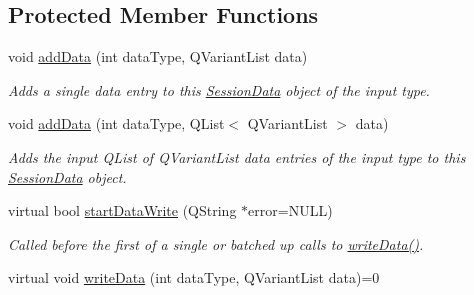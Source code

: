 \subsection*{Protected Member Functions}
\begin{DoxyCompactItemize}
\item 
void \hyperlink{class_session_data_a7cc8594766473824c591396b187354ad}{add\-Data} (int data\-Type, Q\-Variant\-List data)
\begin{DoxyCompactList}\small\item\em Adds a single data entry to this \hyperlink{class_session_data}{Session\-Data} object of the input type. \end{DoxyCompactList}\item 
void \hyperlink{class_session_data_a72da83d35fc78270dbfef9ba9a2b2b4c}{add\-Data} (int data\-Type, Q\-List$<$ Q\-Variant\-List $>$ data)
\begin{DoxyCompactList}\small\item\em Adds the input Q\-List of Q\-Variant\-List data entries of the input type to this \hyperlink{class_session_data}{Session\-Data} object. \end{DoxyCompactList}\item 
virtual bool \hyperlink{class_session_data_ab41387e7d78a4261524a201c78d1bb97}{start\-Data\-Write} (Q\-String $\ast$error=N\-U\-L\-L)
\begin{DoxyCompactList}\small\item\em Called before the first of a single or batched up calls to \hyperlink{class_session_data_ad05a594d8410d638f1a066bfa5a10ba3}{write\-Data()}. \end{DoxyCompactList}\item 
\hypertarget{class_session_data_ad05a594d8410d638f1a066bfa5a10ba3}{virtual void \hyperlink{class_session_data_ad05a594d8410d638f1a066bfa5a10ba3}{write\-Data} (int data\-Type, Q\-Variant\-List data)=0}\label{class_session_data_ad05a594d8410d638f1a066bfa5a10ba3}


\end{DoxyCompactItemize}
